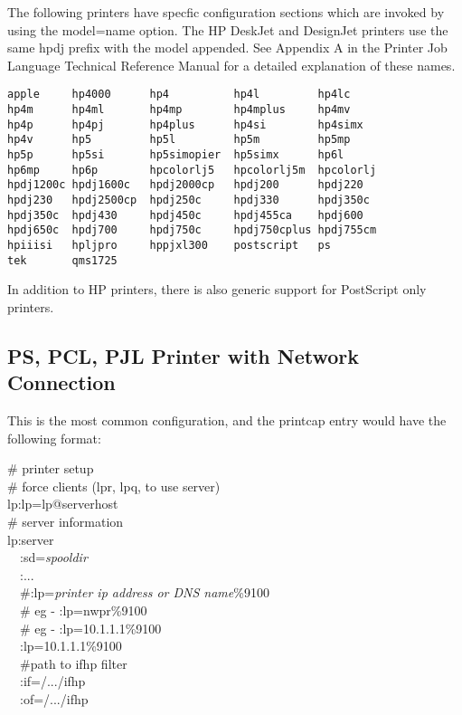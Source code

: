 \documentclass[a4paper]{article}
\begin{document}
The following printers have specfic configuration sections
which are invoked by using the
{\ttfamily model=name}
option.
The HP DeskJet and DesignJet printers use the same
{\ttfamily hpdj} prefix with the model appended.
See Appendix A in the Printer Job Language Technical Reference Manual
for a detailed explanation of these names.
\begin{tscreen}
\begin{verbatim}
apple     hp4000      hp4          hp4l         hp4lc
hp4m      hp4ml       hp4mp        hp4mplus     hp4mv
hp4p      hp4pj       hp4plus      hp4si        hp4simx
hp4v      hp5         hp5l         hp5m         hp5mp
hp5p      hp5si       hp5simopier  hp5simx      hp6l
hp6mp     hp6p        hpcolorlj5   hpcolorlj5m  hpcolorlj
hpdj1200c hpdj1600c   hpdj2000cp   hpdj200      hpdj220
hpdj230   hpdj2500cp  hpdj250c     hpdj330      hpdj350c
hpdj350c  hpdj430     hpdj450c     hpdj455ca    hpdj600
hpdj650c  hpdj700     hpdj750c     hpdj750cplus hpdj755cm
hpiiisi   hpljpro     hppjxl300    postscript   ps
tek       qms1725
\end{verbatim}
\end{tscreen}


In addition to HP printers,
there is also generic support for PostScript only printers.


\subsection{PS, PCL, PJL Printer with Network Connection}

This is the most common configuration,
and the printcap entry would have the following format:
\begin{tscreen}
\# printer setup  \\ 
\#  force clients (lpr, lpq, to use server)  \\ 
lp:lp=lp@serverhost  \\ 
\# server information  \\ 
lp:server  \\ 
~~:sd={\itshape spooldir\/}  \\ 
~~:...  \\ 
~~\#:lp={\itshape printer ip address or DNS name\/}\%9100 \\ 
~~\# eg - :lp=nwpr\%9100 \\ 
~~\# eg - :lp=10.1.1.1\%9100 \\ 
~~:lp=10.1.1.1\%9100 \\ 
~~\#path to ifhp filter  \\ 
~~:if=/.../ifhp  \\ 
~~:of=/.../ifhp
\end{tscreen}
\end{document}
